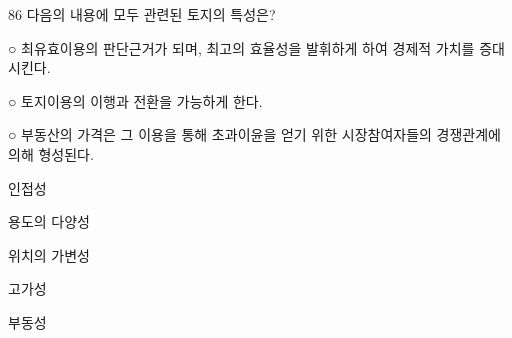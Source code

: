 \begin{question}{86}
다음의 내용에 모두 관련된 토지의 특성은?
\begin{framedtext}
○ 최유효이용의 판단근거가 되며, 최고의 효율성을 발휘하게 하여 경제적 가치를 증대시킨다. \par
○ 토지이용의 이행과 전환을 가능하게 한다. \par
○ 부동산의 가격은 그 이용을 통해 초과이윤을 얻기 위한 시장참여자들의 경쟁관계에 의해 형성된다.
\end{framedtext}
\begin{choices}
  \item 인접성
  \item 용도의 다양성
  \item 위치의 가변성
  \item 고가성
  \item 부동성
\end{choices}
\end{question}
